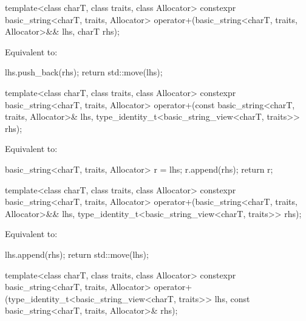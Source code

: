 %
\begin{itemdecl}
template<class charT, class traits, class Allocator>
  constexpr basic_string<charT, traits, Allocator>
    operator+(basic_string<charT, traits, Allocator>&& lhs, charT rhs);
\end{itemdecl}

\begin{itemdescr}
\pnum
\effects
Equivalent to:
\begin{codeblock}
lhs.push_back(rhs);
return std::move(lhs);
\end{codeblock}
\end{itemdescr}

%
\begin{itemdecl}
template<class charT, class traits, class Allocator>
  constexpr basic_string<charT, traits, Allocator>
    operator+(const basic_string<charT, traits, Allocator>& lhs,
              type_identity_t<basic_string_view<charT, traits>> rhs);
\end{itemdecl}

\begin{itemdescr}
\pnum
Equivalent to:
\begin{codeblock}
basic_string<charT, traits, Allocator> r = lhs;
r.append(rhs);
return r;
\end{codeblock}
\end{itemdescr}

%
\begin{itemdecl}
template<class charT, class traits, class Allocator>
  constexpr basic_string<charT, traits, Allocator>
    operator+(basic_string<charT, traits, Allocator>&& lhs,
              type_identity_t<basic_string_view<charT, traits>> rhs);
\end{itemdecl}

\begin{itemdescr}
\pnum
Equivalent to:
\begin{codeblock}
lhs.append(rhs);
return std::move(lhs);
\end{codeblock}
\end{itemdescr}

%
\begin{itemdecl}
template<class charT, class traits, class Allocator>
  constexpr basic_string<charT, traits, Allocator>
    operator+(type_identity_t<basic_string_view<charT, traits>> lhs,
              const basic_string<charT, traits, Allocator>& rhs);
\end{itemdecl}

